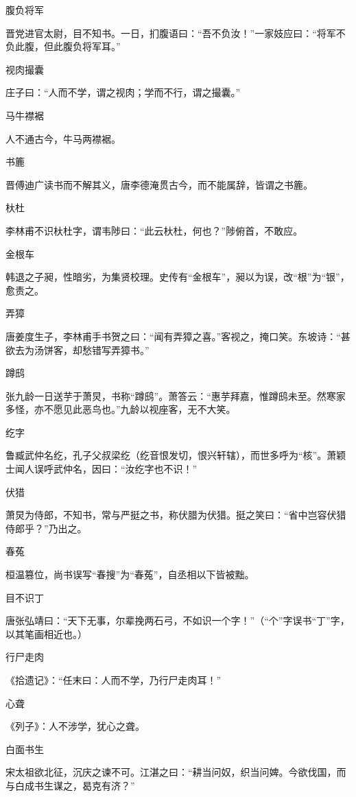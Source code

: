 \documentclass[a4paper,12pt,UTF8,twoside]{ctexbook}
\begin{document}
    腹负将军
    
    晋党进官太尉，目不知书。一日，扪腹语曰：“吾不负汝！”一家妓应曰：“将军不负此腹，但此腹负将军耳。”
    
    视肉撮囊
    
    庄子曰：“人而不学，谓之视肉；学而不行，谓之撮囊。”
    
    马牛襟裾
    
    人不通古今，牛马两襟裾。
    
    书簏
    
    晋傅迪广读书而不解其义，唐李德淹贯古今，而不能属辞，皆谓之书簏。
    
    杕杜
    
    李林甫不识杕杜字，谓韦陟曰：“此云杕杜，何也？”陟俯首，不敢应。
    
    金根车
    
    韩退之子昶，性暗劣，为集贤校理。史传有“金根车”，昶以为误，改“根”为“银”，愈责之。
    
    弄獐
    
    唐姜度生子，李林甫手书贺之曰：“闻有弄獐之喜。”客视之，掩口笑。东坡诗：“甚欲去为汤饼客，却愁错写弄獐书。”
    
    蹲鸱
    
    张九龄一日送芋于萧炅，书称“蹲鸱”。萧答云：“惠芋拜嘉，惟蹲鸱未至。然寒家多怪，亦不愿见此恶鸟也。”九龄以视座客，无不大笑。
    
    纥字
    
    鲁臧武仲名纥，孔子父叔梁纥（纥音恨发切，恨兴轩辖），而世多呼为“核”。萧颖士闻人误呼武仲名，因曰：“汝纥字也不识！”
    
    伏猎
    
    萧炅为侍郎，不知书，常与严挺之书，称伏腊为伏猎。挺之笑曰：“省中岂容伏猎侍郎乎？”乃出之。
    
    春菟
    
    桓温篡位，尚书误写“春搜”为“春菟”，自丞相以下皆被黜。
    
    目不识丁
    
    唐张弘靖曰：“天下无事，尔辈挽两石弓，不如识一个字！”（“个”字误书“丁”字，以其笔画相近也。）
    
    行尸走肉
    
    《拾遗记》：“任末曰：人而不学，乃行尸走肉耳！”
    
    心聋
    
    《列子》：人不涉学，犹心之聋。
    
    白面书生
    
    宋太祖欲北征，沉庆之谏不可。江湛之曰：“耕当问奴，织当问婢。今欲伐国，而与白成书生谋之，曷克有济？”
    
\end{document}
